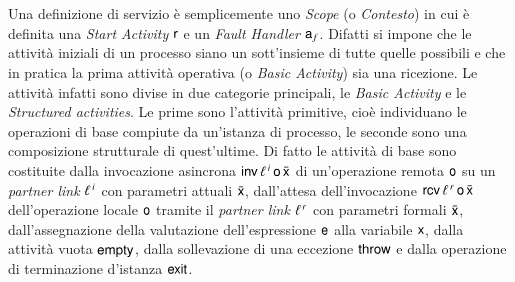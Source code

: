 Una definizione di servizio è semplicemente uno \emph{Scope} (o
\emph{Contesto}) in cui è definita una
\emph{Start Activity} ${\sf r}$ e un \emph{Fault Handler} ${\sf a}_f$. Difatti si
impone che le attività iniziali di un processo siano un sott'insieme di tutte
quelle possibili e che in pratica la prima attività operativa (o \emph{Basic
Activity}) sia una ricezione. Le attività infatti sono divise in due categorie
principali, le \emph{Basic Activity} e le \emph{Structured activities}. Le
prime sono l'attività primitive, cioè individuano le operazioni di
base compiute da un'istanza di processo, le seconde sono una composizione
strutturale di quest'ultime. Di fatto le attività di base sono costituite
dalla invocazione asincrona ${\sf inv}\,\ell^{\,i}\,{\sf o}\,\bar{{\sf x}}$ di un'operazione
remota ${\sf o}$ su un \emph{partner link} $\ell^{\,i}$ con parametri attuali
$\bar{{\sf x}}$, dall'attesa dell'invocazione ${\sf rcv}\,\ell^{\,r}\, {\sf o}\, \bar{{\sf x}}$
dell'operazione locale ${\sf o}$ tramite il \emph{partner link} $\ell^{\,r}$ con
parametri formali ${\bar{{\sf x}}}$, dall'assegnazione della valutazione
dell'espressione ${\sf e}$ alla variabile ${\sf x}$, dalla attività vuota ${\sf empty}$,
dalla sollevazione di una eccezione ${\sf throw}$ e dalla operazione di terminazione
d'istanza ${\sf exit}$.

